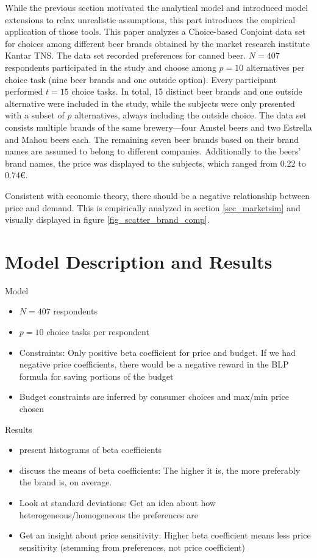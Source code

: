 \documentclass[12pt,a4paper]{article}
\begin{document}
While the previous section motivated the analytical model and introduced model extensions to relax unrealistic assumptions,
this part introduces the empirical application of those tools.
This paper analyzes a Choice-based Conjoint data set for choices among different beer brands obtained by the market research institute Kantar TNS.
The data set recorded preferences for canned beer.
 $N=407$ respondents participated in the study and choose among $p=10$ alternatives per choice task (nine beer brands and one outside option).
Every participant performed $t=15$ choice tasks. In total, 15 distinct beer brands and one outside alternative were included in the study,
while the subjects were only presented with a subset of $p$ alternatives, always including the outside choice.
The data set consists multiple brands of the same brewery---four Amstel beers and two Estrella and Mahou beers each.
The remaining seven beer brands based on their brand names are assumed to belong to different companies.
Additionally to the beers' brand names, the price was displayed to the subjects, which ranged from 0.22 to 0.74\euro.

Consistent with economic theory, there should be a negative relationship between price and demand.
This is empirically analyzed in section \ref{sec_marketsim} and visually displayed in figure \ref{fig_scatter_brand_comp}.


\section{Model Description and Results}
Model
\begin{itemize}
\item $N=407$ respondents
\item $p=10$ choice tasks per respondent
\item Constraints: Only positive beta coefficient for price and budget. If we had negative price coefficients, there would be a negative reward in the BLP formula for saving portions of the budget
\item Budget constraints are inferred by consumer choices and max/min price chosen
\end{itemize}

Results
\begin{itemize}
\item present histograms of beta coefficients
\item discuss the means of beta coefficients: The higher it is, the more preferably the brand is, on average.
\item Look at standard deviations: Get an idea about how heterogeneous/homogeneous the preferences are
\item Get an insight about price sensitivity: Higher beta coefficient means less price sensitivity (stemming from preferences, not price coefficient)
\end{itemize}
\end{document}
